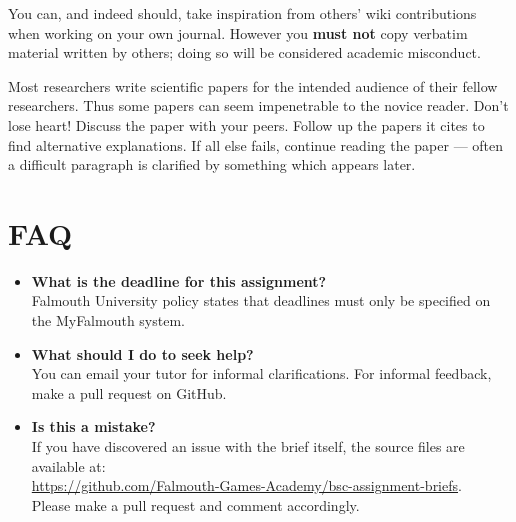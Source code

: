 \documentclass{../../fal_assignment}
\begin{document}
You can, and indeed should, take inspiration from others' wiki contributions when working on your own journal.
However you \textbf{must not} copy verbatim material written by others;
doing so will be considered academic misconduct.

Most researchers write scientific papers for the intended audience of their fellow researchers.
Thus some papers can seem impenetrable to the novice reader.
Don't lose heart!
Discuss the paper with your peers.
Follow up the papers it cites to find alternative explanations.
If all else fails, continue reading the paper --- often a difficult paragraph is clarified by something which appears later.

\section*{FAQ}

\begin{itemize}
	\item 	\textbf{What is the deadline for this assignment?} \\ 
    		Falmouth University policy states that deadlines must only be specified on the MyFalmouth system.
    		
	\item 	\textbf{What should I do to seek help?} \\ 
    		You can email your tutor for informal clarifications. For informal feedback, make a pull request on GitHub. 
    		
    	\item 	\textbf{Is this a mistake?} \\ 	
    		If you have discovered an issue with the brief itself, the source files are available at: \\
    		\url{https://github.com/Falmouth-Games-Academy/bsc-assignment-briefs}.\\
    		 Please make a pull request and comment accordingly.
\end{itemize}

%
\end{document}
